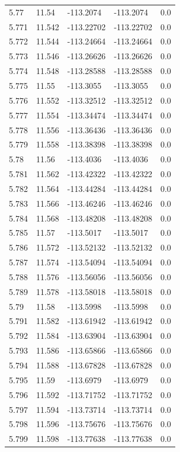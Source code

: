 \begin{tabular}{lllll}
5.77 & 11.54 & -113.2074 & -113.2074 & 0.0 \\
5.771 & 11.542 & -113.22702 & -113.22702 & 0.0 \\
5.772 & 11.544 & -113.24664 & -113.24664 & 0.0 \\
5.773 & 11.546 & -113.26626 & -113.26626 & 0.0 \\
5.774 & 11.548 & -113.28588 & -113.28588 & 0.0 \\
5.775 & 11.55 & -113.3055 & -113.3055 & 0.0 \\
5.776 & 11.552 & -113.32512 & -113.32512 & 0.0 \\
5.777 & 11.554 & -113.34474 & -113.34474 & 0.0 \\
5.778 & 11.556 & -113.36436 & -113.36436 & 0.0 \\
5.779 & 11.558 & -113.38398 & -113.38398 & 0.0 \\
5.78 & 11.56 & -113.4036 & -113.4036 & 0.0 \\
5.781 & 11.562 & -113.42322 & -113.42322 & 0.0 \\
5.782 & 11.564 & -113.44284 & -113.44284 & 0.0 \\
5.783 & 11.566 & -113.46246 & -113.46246 & 0.0 \\
5.784 & 11.568 & -113.48208 & -113.48208 & 0.0 \\
5.785 & 11.57 & -113.5017 & -113.5017 & 0.0 \\
5.786 & 11.572 & -113.52132 & -113.52132 & 0.0 \\
5.787 & 11.574 & -113.54094 & -113.54094 & 0.0 \\
5.788 & 11.576 & -113.56056 & -113.56056 & 0.0 \\
5.789 & 11.578 & -113.58018 & -113.58018 & 0.0 \\
5.79 & 11.58 & -113.5998 & -113.5998 & 0.0 \\
5.791 & 11.582 & -113.61942 & -113.61942 & 0.0 \\
5.792 & 11.584 & -113.63904 & -113.63904 & 0.0 \\
5.793 & 11.586 & -113.65866 & -113.65866 & 0.0 \\
5.794 & 11.588 & -113.67828 & -113.67828 & 0.0 \\
5.795 & 11.59 & -113.6979 & -113.6979 & 0.0 \\
5.796 & 11.592 & -113.71752 & -113.71752 & 0.0 \\
5.797 & 11.594 & -113.73714 & -113.73714 & 0.0 \\
5.798 & 11.596 & -113.75676 & -113.75676 & 0.0 \\
5.799 & 11.598 & -113.77638 & -113.77638 & 0.0 \\

\end{tabular}
